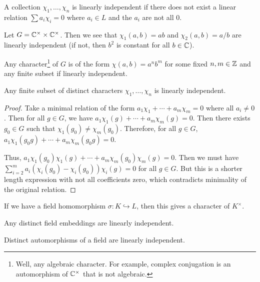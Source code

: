 \documentclass[10pt, twoside]{article}
\begin{document}
    \begin{defn}
        A collection $\chi_1, \ldots, \chi_n$ is linearly independent if there does not exist a linear relation $\sum a_i \chi_i = 0$ where $a_i \in L$ and the $a_i$ are not all $0$.
    \end{defn}

    \begin{exm}
        Let $G = \mathbb{C}^{\times} \times \mathbb{C}^{\times}$. Then we see that $\chi_1(a,b) = ab$ and $\chi_2(a,b) = a/b$ are linearly independent (if not, then $b^2$ is constant for all $b \in \mathbb{C}$).
    \end{exm}

    \begin{rmk}
        Any character\footnote{Well, any algebraic character. For example, complex conjugation is an automorphism of $\mathbb{C}^{\times}$ that is not algebraic.} of $G$ is of the form $\chi(a,b) = a^nb^m$ for some fixed $n,m \in \mathbb{Z}$ and any finite subset if linearly independent.
    \end{rmk}

    \begin{thm}
        Any finite subset of distinct characters $\chi_1, \ldots, \chi_n$ is linearly independent.
        \begin{proof}
            Take a minimal relation of the form $a_1 \chi_1 + \cdots + a_m\chi_m = 0$ where all $a_i \neq 0$. Then for all $g \in G$, we have $a_1\chi_1(g) + \cdots + a_m\chi_m(g) = 0$. Then there exists $g_0 \in G$ such that $\chi_1(g_0) \neq \chi_m(g_0)$. Therefore, for all $g \in G$, $a_1\chi_1(g_0g) + \cdots + a_m\chi_m(g_0g) = 0$.

            Thus, $a_1\chi_1(g_0)\chi_1(g) + \cdots + a_m\chi_m(g_0)\chi_m(g) = 0$. Then we must have $\sum_{i=2}^m a_i(\chi_i(g_0) - \chi_i(g_0))\chi_i(g) = 0$ for all $g\in G$. But this is a shorter length expression with not all coefficients zero, which contradicts minimality of the original relation.
        \end{proof}
    \end{thm}

    If we have a field homomorphism $\sigma: K \hookrightarrow L$, then this gives a character of $K^{\times}$.

    \begin{cor}
        Any distinct field embeddings are linearly independent.
    \end{cor}

    \begin{cor}
        Distinct automorphisms of a field are linearly independent.
    \end{cor}
\end{document}
